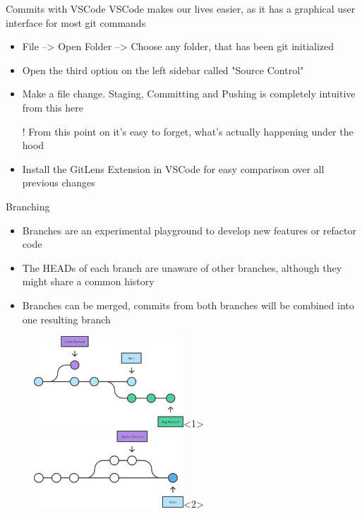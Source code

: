 \documentclass[en]{sdqbeamer}
\begin{document}
\begin{frame}{Commits with VSCode}
VSCode makes our lives easier, as it has a graphical user interface for most git commands
    \begin{itemize}
        \item File --> Open Folder --> Choose any folder, that has been git initialized
        \item Open the third option on the left sidebar called "Source Control"
        \item Make a file change. Staging, Committing and Pushing is completely intuitive from this here
        \item[!] From this point on it's easy to forget, what's actually happening under the hood
        \vspace{12pt}
        \item Install the GitLens Extension in VSCode for easy comparison over all previous changes
    \end{itemize}
\end{frame}

\begin{frame}{Branching}
\begin{itemize}
    \item Branches are an experimental playground to develop new features or refactor code
    \item The HEADs of each branch are unaware of other branches, although they might share a common history
    \item<2-> Branches can be merged, commits from both branches will be combined into one resulting branch
\end{itemize}
\begin{figure}[!ht]
    \centering
    \includegraphics[width=0.5\textwidth]{pictures/01Gitbranch.png}<1>
    \includegraphics[width=0.5\textwidth]{pictures/05-06Fastforwardmerge.png}<2>
\end{figure}
\end{frame}
\end{document}
